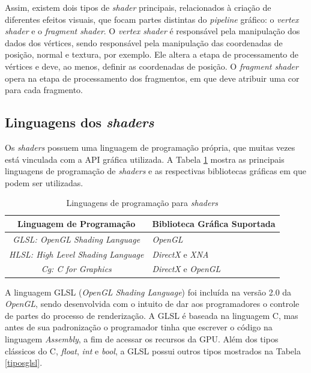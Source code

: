 	 Assim, existem dois tipos de \textit{shader} principais, relacionados à criação de diferentes efeitos visuais, que focam partes distintas do \textit{pipeline} gráfico: o \textit{vertex shader} e o \textit{fragment shader}. O \textit{vertex shader} é responsável pela manipulação dos dados dos vértices, sendo responsável pela manipulação das coordenadas de posição, normal e textura, por exemplo. Ele altera a etapa de processamento de vértices e deve, ao menos, definir as coordenadas de posição.  O \textit{fragment shader} opera na etapa de processamento dos fragmentos, em que deve atribuir uma cor para cada fragmento. 

\subsection{Linguagens dos \textit{shaders}}

	
	Os \textit{shaders} possuem uma linguagem de programação própria, que muitas vezes está vinculada com a API gráfica utilizada.  A Tabela \ref{lingshader} mostra as principais linguagens de programação de \textit{shaders} e as respectivas bibliotecas gráficas em que podem ser utilizadas. 

	\begin{table}[ht]
	\centering	
	\begin{tabularx}{0.9\textwidth}{cX}
		\toprule
		\textbf{Linguagem de Programação} & \textbf{Biblioteca Gráfica Suportada}  \\
		\midrule
		\textit{GLSL: OpenGL Shading Language} & \textit{OpenGL} \\
		\textit{HLSL: High Level Shading Language} & \textit{DirectX} e \textit{XNA} \\
		\textit{Cg: C for Graphics} & \textit{DirectX} e \textit{OpenGL}\\
		\bottomrule
	\end{tabularx}
	\caption{ Linguagens de programação para \textit{shaders}}
	\label{lingshader}
\end{table}

	A linguagem GLSL (\textit{OpenGL Shading Language}) foi incluída na versão 2.0 da  \textit{OpenGL}, sendo desenvolvida com o intuito de dar aos programadores o controle de partes do processo de renderização. A GLSL é baseada na linguagem C, mas antes de sua padronização o programador tinha que escrever o código na linguagem \textit{Assembly}, a fim de acessar os recursos da GPU. Além dos tipos clássicos do C, \textit{float}, \textit{int} e \textit{bool}, a GLSL possui outros tipos mostrados na Tabela \ref{tiposglsl}.

